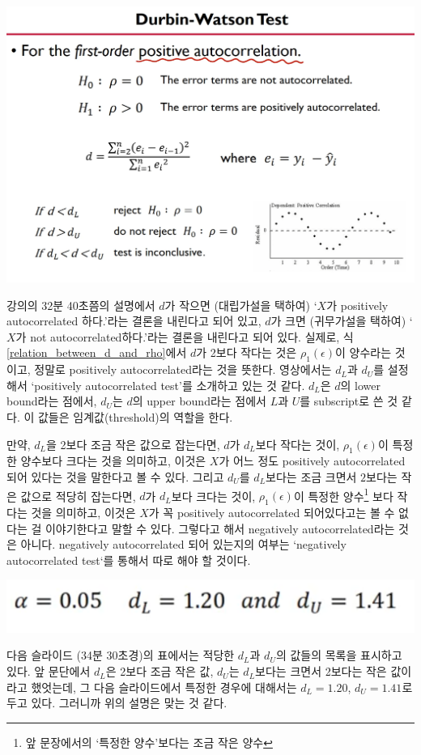 \documentclass{article}
\begin{document}
\begin{center}
\includegraphics[width=.5\textwidth]{positively_autocorrelated_test}
\end{center}

강의의 32분 40초쯤의 설명에서 \(d\)가 작으면 (대립가설을 택하여) `\(X\)가 positively autocorrelated 하다.'라는 결론을 내린다고 되어 있고, \(d\)가 크면 (귀무가설을 택하여) `\(X\)가 not autocorrelated하다.'라는 결론을 내린다고 되어 있다.
실제로, 식 \eqref{relation_between_d_and_rho}에서 \(d\)가 2보다 작다는 것은 \(\rho_1(\epsilon)\)이 양수라는 것이고, 정말로 positively autocorrelated라는 것을 뜻한다.
영상에서는 \(d_L\)과 \(d_U\)를 설정해서 `positively autocorrelated test'를 소개하고 있는 것 같다.
\(d_L\)은 \(d\)의 lower bound라는 점에서, \(d_U\)는 \(d\)의 upper bound라는 점에서 \(L\)과 \(U\)를 subscript로 쓴 것 같다.
이 값들은 임계값(threshold)의 역할을 한다.

만약, \(d_L\)을 2보다 조금 작은 값으로 잡는다면, \(d\)가 \(d_L\)보다 작다는 것이, \(\rho_1(\epsilon)\)이 특정한 양수보다 크다는 것을 의미하고, 이것은 \(X\)가 어느 정도 positively autocorrelated 되어 있다는 것을 말한다고 볼 수 있다.
그리고 \(d_U\)를 \(d_L\)보다는 조금 크면서 \(2\)보다는 작은 값으로 적당히 잡는다면, \(d\)가 \(d_L\)보다 크다는 것이, \(\rho_1(\epsilon)\)이 특정한 양수\footnote{앞 문장에서의 `특정한 양수'보다는 조금 작은 양수} 보다 작다는 것을 의미하고, 이것은 \(X\)가 꼭 positively autocorrelated 되어있다고는 볼 수 없다는 걸 이야기한다고 말할 수 있다.
그렇다고 해서 negatively autocorrelated라는 것은 아니다.
negatively autocorrelated 되어 있는지의 여부는 `negatively autocorrelated test`를 통해서 따로 해야 할 것이다.

\begin{center}
\includegraphics[width=.3\textwidth]{d_L_and_d_U}
\end{center}

다음 슬라이드 (34분 30초경)의 표에서는 적당한 \(d_L\)과 \(d_U\)의 값들의 목록을 표시하고 있다.
앞 문단에서 \(d_L\)은 2보다 조금 작은 값, \(d_U\)는 \(d_L\)보다는 크면서 2보다는 작은 값이라고 했엇는데, 그 다음 슬라이드에서 특정한 경우에 대해서는 \(d_L=1.20\), \(d_U=1.41\)로 두고 있다.
그러니까 위의 설명은 맞는 것 같다.
\end{document}
